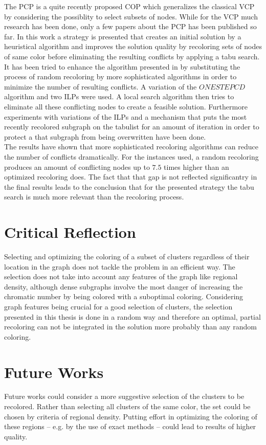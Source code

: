 
The PCP is a quite recently proposed COP which generalizes the classical VCP by considering the possiblity to select subsets of nodes. While for the VCP much research has been done, only a few papers about the PCP has been published so far. In this work a strategy is presented that creates an initial solution by a heuristical algorithm and improves the solution quality by recoloring sets of nodes of same color before eliminating the resulting conflicts by applying a tabu search. It has been tried to enhance the algorithm presented in \cite{noronha-06} by substituting the process of random recoloring by more sophisticated algorithms in order to minimize the number of resulting conflicts. A variation of the $ONESTEPCD$ algorithm \cite{li-00} and two ILPs were used. A local search algorithm then tries to eliminate all these conflicting nodes to create a feasible solution. Furthermore experiments with variations of the ILPs and a mechanism that puts the most recently recolored subgraph on the tabulist for an amount of iteration in order to protect a that subgraph from being overwritten have been done.\\
The results have shown that more sophisticated recoloring algorithms can reduce the number of conflicts dramatically. For the instances used, a random recoloring produces an amount of conflicting nodes up to $7.5$ times higher than an optimized recoloring does. The fact that that gap is not reflected significantry in the final results leads to the conclusion that for the presented strategy the tabu search is much more relevant than the recoloring process.

\section{Critical Reflection}
Selecting and optimizing the coloring of a subset of clusters regardless of their location in the graph does not tackle the problem in an efficient way. The selection does not take into account any features of the graph like regional density, although dense subgraphs involve the most danger of increasing the chromatic number by being colored with a suboptimal coloring. Considering graph features being crucial for a good selection of clusters, the selection presented in this thesis is done in a random way and therefore an optimal, partial recoloring can not be integrated in the solution more probably than any random coloring.  

\section{Future Works}
Future works could consider a more suggestive selection of the clusters to be recolored. Rather than selecting all clusters of the same color, the set could be chosen by criteria of regional density. Putting effort in optimizing the coloring of these regions -- e.g. by the use of exact methods -- could lead to results of higher quality.

